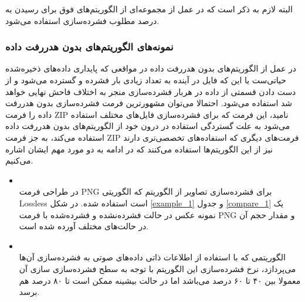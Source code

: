 البته لازم به ذکر است که در عمل از مجموعه‌ای از الگوریتم‌های فوق برای رسیدن به درصد مطلوب فشرده‌سازی استفاده می‌شود.

\subsubsection{نمونه‌های الگوریتم‌های بدون هدررفت داده}
در عمل از الگوریتم‌های بدون هدررفت داده در مواقعی که 
پایداری داده‌های ذخیره‌شده حیاتی‌ست یا این که فایل در آینده به تعداد زیادی بار فشرده و گسترده می‌شود و از دست دادن قسمتی از داده در
هربار فشرده‌سازی منجر به اختلاف فاحش نهایی خواهد شد استفاده می‌شود. احتمالا می‌توان مشهورترین فرمت فشرده‌سازی بدون هدررفت داده را
فرمت 
ZIP
نامید، این فرمت که برای فشرده‌سازی فایل‌های مختلف استفاده می‌شود به علت گستردگی استفاده در درون خود از 
الگوریتم‌های بدون هدررفت داده استفاده می‌کند، به جز فرمت ZIP 
فرمت‌های دیگری که استفاده‌های تخصصی‌تری دارند نیز از این الگوریتم‌ها استفاده می‌کنند که در ادامه به دو مورد مهم ایشان اشاره می‌کنیم.

\begin{itemize}
	\item {}\\
	در طراحی فرمت PNG برای فشرده‌سازی تصاویر از الگوریتم
	که الگوریتی Lossless است استفاده شده. 
	در 
	شکل 	\ref{example_1} و 
	جدول 	\ref{compare_1} 
	یک نمونه عکس در حالت فشرده‌نشده و فشرده‌شده با فرمت PNG
	و مقدار حجم آن در حالت‌های مختلف آورده شده است.

	\item {}\\
	الگوریتمی که با استفاده از اطلاعات ذاتی داده‌های صوتی به فشرده‌سازی آن‌ها می‌پردازد، نرخ فشرده‌سازی این الگوریتم با توجه به 
	سطح فشرده‌سازی سازی آن معمولا بین ۴۰ تا ۶۰ درصد می‌باشد اما در حالت بیشینه ممکن است تا ۸۰ درصد هم برسد.
	
\end{itemize}

